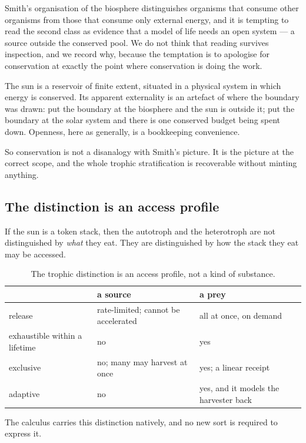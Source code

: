 \documentclass[11pt]{article}
\theoremstyle{plain}
\theoremstyle{definition}
\begin{document}
Smith's organisation of the biosphere \cite{SmithMorowitz} distinguishes organisms that consume other
organisms from those that consume only external energy, and it is tempting to read the second class as
evidence that a model of life needs an open system --- a source outside the conserved pool. We do not
think that reading survives inspection, and we record why, because the temptation is to apologise for
conservation at exactly the point where conservation is doing the work.

The sun is a reservoir of finite extent, situated in a physical system in which energy is conserved.
Its apparent externality is an artefact of where the boundary was drawn: put the boundary at the
biosphere and the sun is outside it; put the boundary at the solar system and there is one conserved
budget being spent down. Openness, here as generally, is a bookkeeping convenience.

So conservation is not a disanalogy with Smith's picture. It is the picture at the correct scope, and
the whole trophic stratification is recoverable without minting anything.

\subsection{The distinction is an access profile}

If the sun is a token stack, then the autotroph and the heterotroph are not distinguished by
\emph{what} they eat. They are distinguished by how the stack they eat may be accessed.

\begin{table}[h]
\centering
\begin{tabular}{@{}lll@{}}
\toprule
& \textbf{a source} & \textbf{a prey} \\
\midrule
release & rate-limited; cannot be accelerated & all at once, on demand \\
exhaustible within a lifetime & no & yes \\
exclusive & no; many may harvest at once & yes; a linear receipt \\
adaptive & no & yes, and it models the harvester back \\
\bottomrule
\end{tabular}
\caption{The trophic distinction is an access profile, not a kind of substance.}
\label{tab:trophic}
\end{table}

The calculus carries this distinction natively, and no new sort is required to express it.
\end{document}
